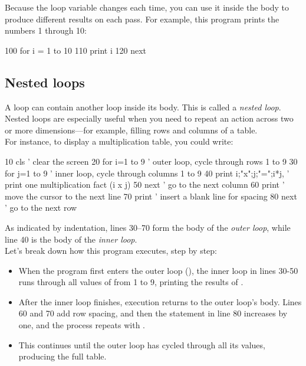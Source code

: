 Because the loop variable changes each time, you can use it inside the body to produce different results on each pass. For example, this program prints the numbers 1 through 10:

\begin{lst}
100 for i = 1 to 10
110   print i
120 next
\end{lst}

\subsection*{Nested loops}

A loop can contain another loop inside its body. This is called a \emph{nested loop}. Nested loops are especially useful when you need to repeat an action across two or more dimensions—for example, filling rows and columns of a table.\\

For instance, to display a multiplication table, you could write:

\begin{lst}
10 cls                        ' clear the screen
20 for i=1 to 9               ' outer loop, cycle through rows 1 to 9
30   for j=1 to 9             ' inner loop, cycle through columns 1 to 9
40     print i;"x";j;"=";i*j, ' print one multiplication fact (i x j)
50   next                     ' go to the next column
60   print                    ' move the cursor to the next line
70   print                    ' insert a blank line for spacing
80 next                       ' go to the next row
\end{lst}

As indicated by indentation, lines 30–70 form the body of the \emph{outer loop}, while line 40 is the body of the \emph{inner loop}.\\

Let’s break down how this program executes, step by step:

\begin{itemize}[itemsep=0pt,label=--]
  \item When the program first enters the outer loop (), the inner loop in lines 30-50 runs through all values of  from 1 to 9, printing the results of .
  \item After the inner loop finishes, execution returns to the outer loop's body. Lines 60 and 70 add row spacing, and then the  statement in line 80 increases  by one, and the process repeats with .
  \item This continues until the outer loop has cycled through all its values, producing the full table.
\end{itemize}

